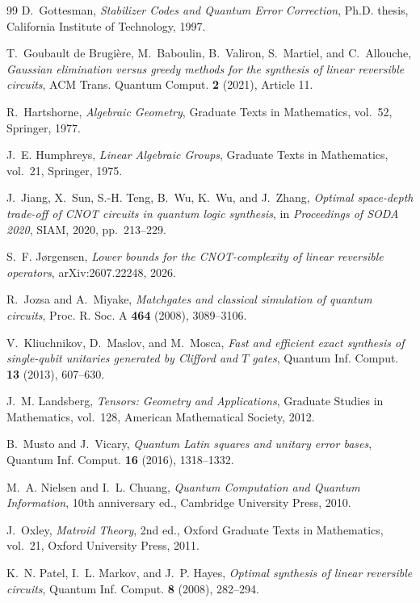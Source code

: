 \begin{thebibliography}{99}
D.~Gottesman,
\emph{Stabilizer Codes and Quantum Error Correction},
Ph.D. thesis, California Institute of Technology, 1997.

T.~Goubault de Brugi\`ere, M.~Baboulin, B.~Valiron, S.~Martiel, and C.~Allouche,
\emph{Gaussian elimination versus greedy methods for the synthesis of linear reversible circuits},
ACM Trans. Quantum Comput. \textbf{2} (2021), Article 11.

R.~Hartshorne,
\emph{Algebraic Geometry},
Graduate Texts in Mathematics, vol.~52, Springer, 1977.

J.~E. Humphreys,
\emph{Linear Algebraic Groups},
Graduate Texts in Mathematics, vol.~21, Springer, 1975.

J.~Jiang, X.~Sun, S.-H. Teng, B.~Wu, K.~Wu, and J.~Zhang,
\emph{Optimal space-depth trade-off of CNOT circuits in quantum logic synthesis},
in \emph{Proceedings of SODA 2020}, SIAM, 2020, pp.~213--229.

S.~F. J\o rgensen,
\emph{Lower bounds for the CNOT-complexity of linear reversible operators},
arXiv:2607.22248, 2026.

R.~Jozsa and A.~Miyake,
\emph{Matchgates and classical simulation of quantum circuits},
Proc. R. Soc. A \textbf{464} (2008), 3089--3106.

V.~Kliuchnikov, D.~Maslov, and M.~Mosca,
\emph{Fast and efficient exact synthesis of single-qubit unitaries generated by Clifford and $T$ gates},
Quantum Inf. Comput. \textbf{13} (2013), 607--630.

J.~M. Landsberg,
\emph{Tensors: Geometry and Applications},
Graduate Studies in Mathematics, vol.~128, American Mathematical Society, 2012.

B.~Musto and J.~Vicary,
\emph{Quantum Latin squares and unitary error bases},
Quantum Inf. Comput. \textbf{16} (2016), 1318--1332.

M.~A. Nielsen and I.~L. Chuang,
\emph{Quantum Computation and Quantum Information}, 10th anniversary ed.,
Cambridge University Press, 2010.

J.~Oxley,
\emph{Matroid Theory}, 2nd ed.,
Oxford Graduate Texts in Mathematics, vol.~21, Oxford University Press, 2011.

K.~N. Patel, I.~L. Markov, and J.~P. Hayes,
\emph{Optimal synthesis of linear reversible circuits},
Quantum Inf. Comput. \textbf{8} (2008), 282--294.


\end{thebibliography}
